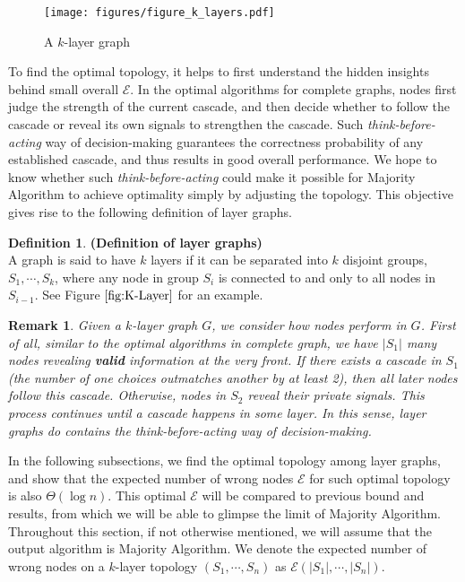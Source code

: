 \documentclass[a4paper,UKenglish]{lipics}
\newtheorem{rmk}{Remark}
\theoremstyle{definition}
\newtheorem{defn}[thm]{Definition}
\begin{document}
\begin{figure}
\centering
\texttt{[image: figures/figure\_k\_layers.pdf]}
\caption{A $k$-layer graph}
\label{fig:K-Layer}
\end{figure}

To find the optimal topology, it helps to first understand the hidden insights behind small overall $\mathcal{E}$.
In the optimal algorithms for complete graphs, nodes first judge the strength of the current cascade,
	and then decide whether to follow the cascade or reveal its own signals to strengthen the cascade.
Such \emph{think-before-acting} way of decision-making guarantees the correctness probability of any established cascade, and thus results in good overall performance.
We hope to know whether such \emph{think-before-acting} could make it possible for Majority Algorithm to achieve optimality simply by adjusting the topology.
This objective gives rise to the following definition of layer graphs.

\begin{defn} {\bf (Definition of layer graphs)}
\\
A graph is said to have $k$ layers if it can be separated into $k$ disjoint groups, $S_1, \dotsb, S_k$, where any node in group $S_i$ is connected to and only to all nodes in $S_{i-1}$. See Figure $\ref{fig:K-Layer}$ for an example.
\end{defn}

\begin{rmk}
\label{rmk2}
Given a $k$-layer graph $G$, we consider how nodes perform in $G$.
First of all, similar to the optimal algorithms in complete graph,
	we have $|S_1|$ many nodes revealing \textbf{valid} information at the very front.
If there exists a cascade in $S_1$ (the number of one choices outmatches another by at least 2),
	then all later nodes follow this cascade.
Otherwise, nodes in $S_2$ reveal their private signals.
This process continues until a cascade happens in some layer.
In this sense, layer graphs do contains the think-before-acting way of decision-making.
\end{rmk}

In the following subsections, we find the optimal topology among layer graphs, 
	and show that the expected number of wrong nodes $\mathcal{E}$ for such optimal topology is also $\Theta(\log n)$. 
This optimal $\mathcal{E}$ will be compared to previous bound and results,
	from which we will be able to glimpse the limit of Majority Algorithm. 
Throughout this section, if not otherwise mentioned, we will assume that the output algorithm is Majority Algorithm.
We denote the expected number of wrong nodes on a $k$-layer topology $(S_1, \dotsb, S_n)$ as $\mathcal{E}(|S_1|, \dotsb, |S_n|)$.
\end{document}
